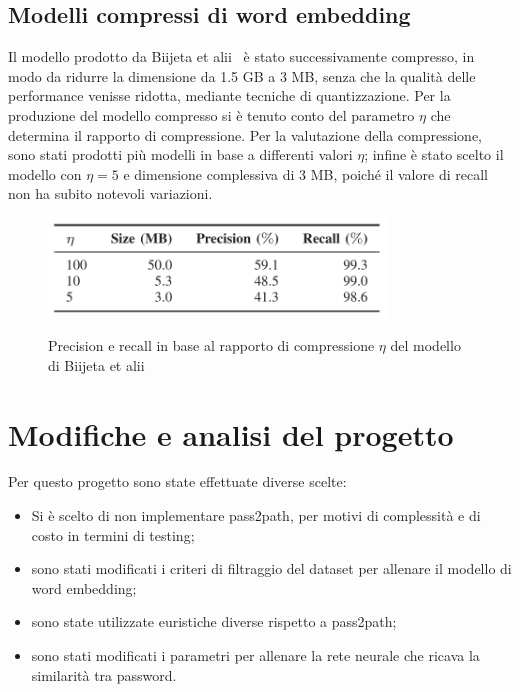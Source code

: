 \subsection{Modelli compressi di word embedding}
\label{sec:modelli compressi word embedding}
Il modello prodotto da Biijeta et alii~\cite{biijeta} è stato successivamente compresso, in modo da ridurre la dimensione da 1.5 GB a 3 MB, senza che la qualità delle performance venisse ridotta, mediante tecniche di quantizzazione.
Per la produzione del modello compresso si è tenuto conto del parametro $\eta$ che determina il rapporto di compressione. Per la valutazione della compressione, sono stati prodotti più modelli in base a differenti valori $\eta$; infine è stato scelto il modello con $\eta=5$ e dimensione complessiva di 3 MB, poiché il valore di recall non ha subito notevoli variazioni.
\begin{figure}[h]
    \centering
    \includegraphics[width=9cm]{./immagini/compressed_model.png}
    \label{compressed_model}
    \caption{Precision e recall in base al rapporto di compressione $\eta$ del modello di Biijeta et alii~\cite{biijeta}}
\end{figure}
\section{Modifiche e analisi del progetto}
\label{sec:modifiche analisi del progetto}
Per questo progetto sono state effettuate diverse scelte:

\begin{itemize}
    \item Si è scelto di non implementare pass2path, per motivi di complessità e di costo in termini di testing;
    \item sono stati modificati i criteri di filtraggio del dataset per allenare il modello di word embedding;
    \item sono state utilizzate euristiche diverse rispetto a pass2path;
    \item sono stati modificati i parametri per allenare la rete neurale che ricava la similarità tra password.
\end{itemize}
